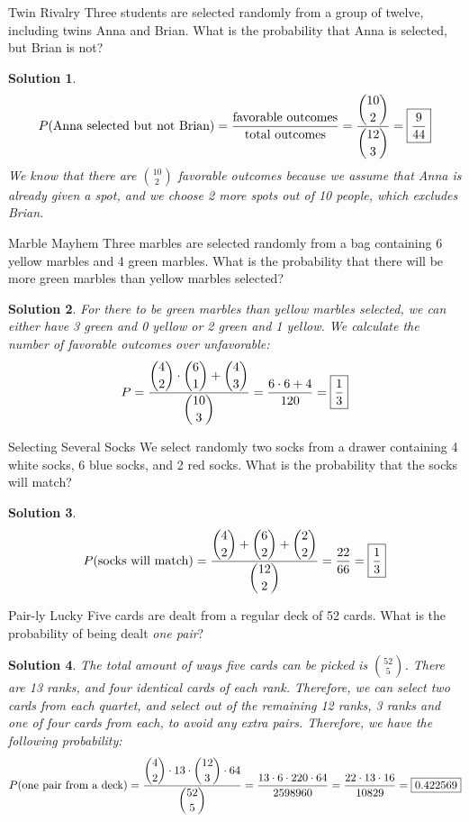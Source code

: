 \documentclass[11pt]{article}
\newtheorem*{solution}{Solution}
\theoremstyle{mystyle}
\begin{document}
\begin{psproblem}{Twin Rivalry}{}
Three students are selected randomly from a group of twelve, including twins Anna and Brian. What is the probability that Anna is selected, but Brian is not?
\end{psproblem}

\begin{solution}
\[ P(\text{Anna selected but not Brian})=\dfrac{\text{favorable outcomes}}{\text{total outcomes}}=
\dfrac{\dbinom{10}{2}}{\dbinom{12}{3}}=\boxed{\dfrac{9}{44}}
\]
We know that there are $\binom{10}{2}$ favorable outcomes because we assume that Anna is already given a spot, and we choose 2 more spots out of 10 people, which excludes Brian.
\end{solution}

\begin{psproblem}{Marble Mayhem}{}
Three marbles are selected randomly from a bag containing 6 yellow marbles and 4 green marbles. What is the probability that there will be more green marbles than yellow marbles selected?
\end{psproblem}

\begin{solution}
For there to be green marbles than yellow marbles selected, we can either have 3 green and 0 yellow or 2 green and 1 yellow. We calculate the number of favorable outcomes over unfavorable:
\[
P=\dfrac{\dbinom{4}{2} \cdot \dbinom{6}{1} + \dbinom{4}{3}}{\dbinom{10}{3}}=\dfrac{6\cdot 6+4}{120}=\boxed{\dfrac{1}{3}}
\]
\end{solution}

\begin{psproblem}{Selecting Several Socks}{}
We select randomly two socks from a drawer containing 4 white socks, 6 blue socks, and 2 red socks. What is the probability that the socks will match?
\end{psproblem}

\begin{solution}
\[ P(\text{socks will match}) = \dfrac{\dbinom{4}{2}+\dbinom{6}{2}+\dbinom{2}{2}}{\dbinom{12}{2}}=\dfrac{22}{66}=\boxed{\dfrac{1}{3}}\]
\end{solution}

\begin{psproblem}{Pair-ly Lucky}{}
Five cards are dealt from a regular deck of 52 cards. What is the probability of being dealt \textit{one pair}?
\end{psproblem}

\begin{solution}
The total amount of ways five cards can be picked is $\binom{52}{5}$. There are 13 ranks, and four identical cards of each rank. Therefore, we can select two cards from each quartet, and select out of the remaining 12 ranks, 3 ranks and one of four cards from each, to avoid any extra pairs. Therefore, we have the following probability:
\[ P(\text{one pair from a deck})=\dfrac{\dbinom{4}{2} \cdot 13 \cdot \dbinom{12}{3} \cdot 64}{\dbinom{52}{5}} = \dfrac{13 \cdot 6 \cdot 220 \cdot 64}{2598960}=\dfrac{22\cdot13\cdot16}{10829}=\boxed{0.422569}\]
\end{solution}
\end{document}
